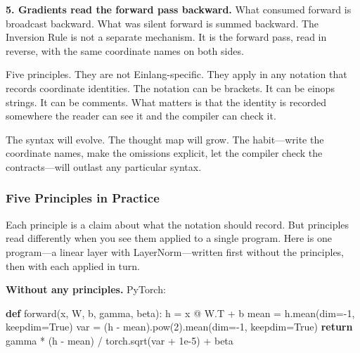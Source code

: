 \documentclass[11pt,titlepage]{article}
\newenvironment{Shaded}{}{}
\newcommand{\BuiltInTok}[1]{#1}
\newcommand{\ControlFlowTok}[1]{\textcolor[rgb]{0.00,0.44,0.13}{\textbf{#1}}}
\newcommand{\DecValTok}[1]{\textcolor[rgb]{0.25,0.63,0.44}{#1}}
\newcommand{\FloatTok}[1]{\textcolor[rgb]{0.25,0.63,0.44}{#1}}
\newcommand{\KeywordTok}[1]{\textcolor[rgb]{0.00,0.44,0.13}{\textbf{#1}}}
\newcommand{\NormalTok}[1]{#1}
\newcommand{\OperatorTok}[1]{\textcolor[rgb]{0.40,0.40,0.40}{#1}}
\newcommand{\VariableTok}[1]{\textcolor[rgb]{0.10,0.09,0.49}{#1}}
\begin{document}
\textbf{5. Gradients read the forward pass backward.} What consumed
forward is broadcast backward. What was silent forward is summed
backward. The Inversion Rule is not a separate mechanism. It is the
forward pass, read in reverse, with the same coordinate names on both
sides.

Five principles. They are not Einlang-specific. They apply in any
notation that records coordinate identities. The notation can be
brackets. It can be einops strings. It can be comments. What matters is
that the identity is recorded somewhere the reader can see it and the
compiler can check it.

The syntax will evolve. The thought map will grow. The habit---write the
coordinate names, make the omissions explicit, let the compiler check
the contracts---will outlast any particular syntax.

\hypertarget{five-principles-in-practice}{%
\subsubsection{Five Principles in
Practice}\label{five-principles-in-practice}}

Each principle is a claim about what the notation should record. But
principles read differently when you see them applied to a single
program. Here is one program---a linear layer with LayerNorm---written
first without the principles, then with each applied in turn.

\textbf{Without any principles.} PyTorch:

\begin{Shaded}
\begin{Highlighting}[]
\KeywordTok{def}\NormalTok{ forward(x, W, b, gamma, beta):}
\NormalTok{    h }\OperatorTok{=}\NormalTok{ x }\OperatorTok{@}\NormalTok{ W.T }\OperatorTok{+}\NormalTok{ b}
\NormalTok{    mean }\OperatorTok{=}\NormalTok{ h.mean(dim}\OperatorTok{=-}\DecValTok{1}\NormalTok{, keepdim}\OperatorTok{=}\VariableTok{True}\NormalTok{)}
\NormalTok{    var }\OperatorTok{=}\NormalTok{ (h }\OperatorTok{-}\NormalTok{ mean).}\BuiltInTok{pow}\NormalTok{(}\DecValTok{2}\NormalTok{).mean(dim}\OperatorTok{=-}\DecValTok{1}\NormalTok{, keepdim}\OperatorTok{=}\VariableTok{True}\NormalTok{)}
    \ControlFlowTok{return}\NormalTok{ gamma }\OperatorTok{*}\NormalTok{ (h }\OperatorTok{-}\NormalTok{ mean) }\OperatorTok{/}\NormalTok{ torch.sqrt(var }\OperatorTok{+} \FloatTok{1e-5}\NormalTok{) }\OperatorTok{+}\NormalTok{ beta}
\end{Highlighting}
\end{Shaded}
\end{document}
